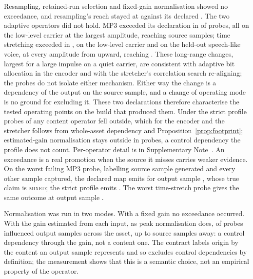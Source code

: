 \documentclass[preprint,3p,11pt,authoryear]{elsarticle}
\begin{document}
Resampling, retained-run selection and fixed-gain normalisation showed no
exceedance, and resampling's reach stayed at \KtwoResampleReach{} against its
declared \KresampleFp{}. The two adaptive operators did not hold. MP3 exceeded
its declaration in \KtwoMpExceed{} of \KtwoProbesPerOp{} probes, all on the
low-level carrier at the largest amplitude, reaching \KtwoMpReach{} source
samples; time stretching exceeded in \KtwoStExceed{}, on the low-level carrier
and on the held-out speech-like voice, at every amplitude from \KtwoStMinAmp{}
upward, reaching \KtwoStReach{}. These long-range changes, largest for a large impulse on a quiet carrier, are
consistent with adaptive bit allocation in the encoder and with the stretcher's
correlation search re-aligning; the probes do not isolate either mechanism. Either
way the change is a dependency of the output on the source sample, and a change
of operating mode is no ground for excluding it. These two declarations
therefore characterise the tested operating points on the build that produced
them. Under the strict profile \KtwoStrictProbes{} probes of any content operator
fell outside, which for the encoder and the stretcher follows from whole-asset
dependency and Proposition~\ref{prop:footprint}; estimated-gain normalisation
stays outside in \KtwoNormCtrlExceed{} probes, a control dependency the profile
does not count. Per-operator detail is in Supplementary
Note~\NoteHoldout{}. An exceedance is a real promotion when the
source it misses carries weaker evidence. On the worst failing MP3 probe,
labelling source sample \KtwoDemoMpSrc{} generated and every other sample
captured, the declared map emits \textsc{\KtwoDemoMpDeclared} for output sample
\KtwoDemoMpOut{}, whose true claim is \textsc{mixed}; the strict profile emits
\textsc{\KtwoDemoMpStrict}. The worst time-stretch probe gives the same outcome
at output sample \KtwoDemoStOut{}.

Normalisation was run in two modes. With a fixed gain no exceedance occurred.
With the gain estimated from each input, as peak normalisation does,
\KtwoNormCtrlExceed{} of \KtwoProbesPerOp{} probes influenced output samples
across the asset, up to \KtwoNormCtrlReach{} source samples away: a control
dependency through the gain, not a content one. The contract labels origin by
the content an output sample represents and so excludes control dependencies by
definition; the measurement shows that this is a semantic choice, not an
empirical property of the operator.
\end{document}
